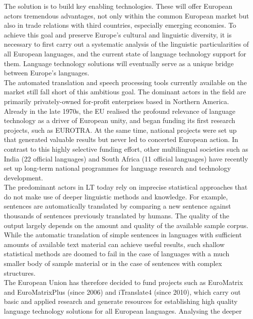 \begin{multicols}{2}
The solution is to build key enabling technologies. These will offer European
actors tremendous advantages, not only within the common European market but
also in trade relations with third countries, especially emerging economies. To
achieve this goal and preserve Europe’s cultural and linguistic diversity, it
is necessary to first carry out a systematic analysis of the linguistic
particularities of all European languages, and the current state of language
technology support for them. Language technology solutions will eventually
serve as a unique bridge between Europe’s languages.\\
The automated translation and speech processing tools currently available on
the market still fall short of this ambitious goal. The dominant actors in the
field are primarily privately-owned for-profit enterprises based in Northern
America. Already in the late 1970s, the EU realised the profound relevance of
language technology as a driver of European unity, and began funding its first
research projects, such as EUROTRA. At the same time, national projects were
set up that generated valuable results but never led to concerted European
action. In contrast to this highly selective funding effort, other multilingual
societies such as India (22 official languages) and South Africa (11 official
languages) have recently set up long-term national programmes for language
research and technology development.\\
The predominant actors in LT today rely on imprecise statistical approaches
that do not make use of deeper linguistic methods and knowledge. For example,
sentences are automatically translated by comparing a new sentence against
thousands of sentences previously translated by humans. The quality of the
output largely depends on the amount and quality of the available sample
corpus. While the automatic translation of simple sentences in languages with
sufficient amounts of available text material can achieve
useful results, such shallow statistical methods
are doomed to fail in the case of languages with a much smaller body of sample
material or in the case of sentences with complex
structures.\\
The European Union has therefore decided to fund projects such as EuroMatrix
and EuroMatrixPlus (since 2006) and iTranslate4 (since 2010), which carry out
basic and applied research and generate resources for establishing high quality
language technology solutions for all European languages. Analysing the deeper

\end{multicols}
